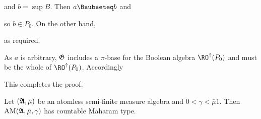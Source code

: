 {\noindent and $b=\sup B$.   Then $a\Bsubseteq b$ and


\noindent so $b\in P_0$.   On the other hand,


\noindent as required.\ \Qed

\medskip

 As $a$ is arbitrary, $\frak G$ includes a $\pi$-base for
the Boolean algebra $\RO^{\uparrow}(P_0)$ and must be the whole of
$\RO^{\uparrow}(P_0)$.   Accordingly


\noindent This completes the proof.
}%

Let $(\frak A,\bar\mu)$ be an atomless semi-finite
measure algebra and $0<\gamma<\bar\mu 1$.   Then
$\mathop{\text{AM}}(\frak A,\bar\mu,\gamma)$ has countable Maharam type.

